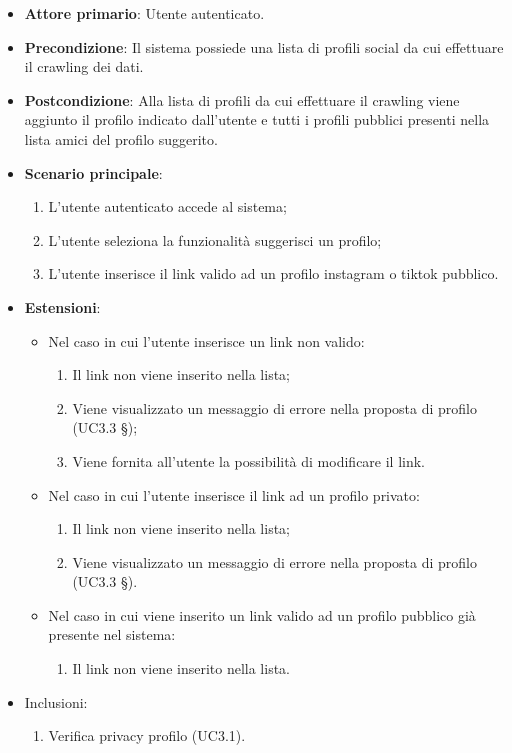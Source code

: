 \begin{itemize}
    \item \textbf{Attore primario}: Utente autenticato.
    \item \textbf{Precondizione}: Il sistema possiede una lista di profili social da cui effettuare il crawling dei dati.
    \item \textbf{Postcondizione}: Alla lista di profili da cui effettuare il crawling viene aggiunto il profilo indicato dall’utente e tutti i profili pubblici presenti nella lista amici del profilo suggerito.
    \item \textbf{Scenario principale}: 
    \begin{enumerate}
        \item L'utente autenticato accede al sistema;
        \item L’utente seleziona la funzionalità suggerisci un profilo;
        \item L’utente inserisce il link valido ad un profilo instagram o tiktok pubblico.
    \end{enumerate}
    \item \textbf{Estensioni}:
    \begin{itemize}
        \item Nel caso in cui l’utente inserisce un link non valido:
        \begin{enumerate}
            \item Il link non viene inserito nella lista;
            \item Viene visualizzato un messaggio di errore nella proposta di profilo (UC3.3 §);
            \item Viene fornita all’utente la possibilità di modificare il link.
        \end{enumerate}
        \item Nel caso in cui l’utente inserisce il link ad un profilo privato:
        \begin{enumerate}
            \item Il link non viene inserito nella lista;
            \item Viene visualizzato un messaggio di errore nella proposta di profilo (UC3.3 §).
        \end{enumerate}
        \item Nel caso in cui viene inserito un link valido ad un profilo pubblico già presente nel sistema:
        \begin{enumerate}
            \item Il link non viene inserito nella lista.
        \end{enumerate} 
    \end{itemize}
    \item Inclusioni:
    \begin{enumerate}
        \item Verifica privacy profilo (UC3.1).
    \end{enumerate}
\end{itemize}

